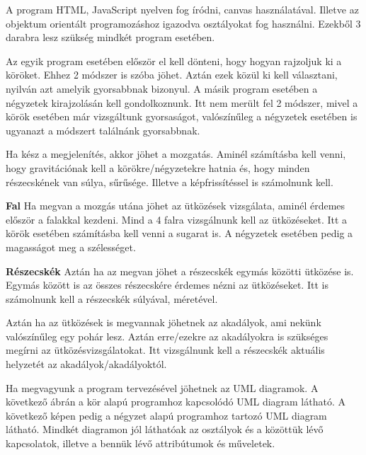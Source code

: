 A program HTML, JavaScript nyelven fog íródni, canvas használatával. Illetve az objektum orientált programozáshoz igazodva osztályokat fog használni. Ezekből 3 darabra lesz szükség mindkét program esetében. 




Az egyik program esetében először el kell dönteni, hogy hogyan rajzoljuk ki a köröket. Ehhez 2 módszer is szóba jöhet. Aztán ezek közül ki kell választani, nyilván azt amelyik gyorsabbnak bizonyul. 
A másik program esetében a négyzetek kirajzolásán kell gondolkoznunk. Itt nem merült fel 2 módszer, mivel a körök esetében már vizsgáltunk gyorsaságot, valószínűleg a négyzetek esetében is ugyanazt a módszert találnánk gyorsabbnak.


Ha kész a megjelenítés, akkor jöhet a mozgatás. Aminél számításba kell venni, hogy gravitációnak kell a körökre/négyzetekre hatnia  és, hogy minden részecskének van súlya, sűrűsége. Illetve a képfrissítéssel is számolnunk kell.



\textbf{Fal}
Ha megvan a mozgás utána jöhet az ütközések vizsgálata, aminél érdemes először a falakkal kezdeni. Mind a 4 falra vizsgálnunk kell az ütközéseket. Itt a körök esetében számításba kell venni a sugarat is. A négyzetek esetében pedig a magasságot meg a szélességet. 

\textbf{Részecskék}
Aztán ha az megvan jöhet a részecskék egymás közötti ütközése is. Egymás között is az összes részecskére érdemes nézni az ütközéseket. Itt is számolnunk kell a részecskék súlyával, méretével. 


Aztán ha az ütközések is megvannak jöhetnek az akadályok, ami nekünk valószínűleg egy pohár lesz. Aztán erre/ezekre az akadályokra is szükséges megírni az ütközésvizsgálatokat. Itt vizsgálnunk kell a részecskék aktuális helyzetét az akadályok/akadályoktól.


Ha megvagyunk a program tervezésével jöhetnek az UML diagramok. A következő ábrán  a kör alapú programhoz kapcsolódó UML diagram látható. A következő képen  pedig a négyzet alapú programhoz tartozó UML diagram látható. Mindkét diagramon jól láthatóak az osztályok és a közöttük lévő kapcsolatok, illetve a bennük lévő attribútumok és műveletek.


